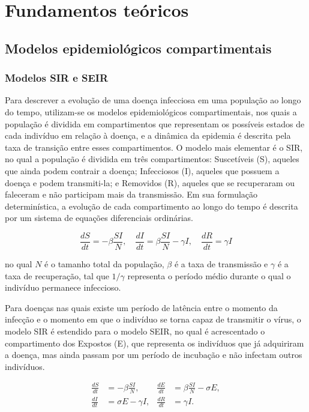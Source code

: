 \documentclass[
	12pt,				%
	openright,			%
	oneside,			%
	a4paper,			%
	english,			%
	french,				%
	spanish,			%
	brazil				%
	]{abntex2}
\begin{document}
\chapter{Fundamentos teóricos}
\label{FT}

\section{Modelos epidemiológicos compartimentais}

\subsection{Modelos SIR e SEIR}

Para descrever a evolução de uma doença infecciosa em uma população ao longo do tempo, utilizam-se os modelos epidemiológicos compartimentais, nos quais a população é dividida em compartimentos que representam os possíveis estados de cada indivíduo em relação à doença, e a dinâmica da epidemia é descrita pela taxa de transição entre esses compartimentos. O modelo mais elementar é o SIR, no qual a população é dividida em três compartimentos: Suscetíveis (S), aqueles que ainda podem contrair a doença; Infecciosos (I), aqueles que possuem a doença e podem transmiti-la; e Removidos (R), aqueles que se recuperaram ou faleceram e não participam mais da transmissão. Em sua formulação determinística, a evolução de cada compartimento ao longo do tempo é descrita por um sistema de equações diferenciais ordinárias.

\begin{equation}\label{eqn:sir}
    \frac{dS}{dt} = -\beta \frac{S I}{N}, \quad
    \frac{dI}{dt} = \beta \frac{S I}{N} - \gamma I, \quad
    \frac{dR}{dt} = \gamma I
\end{equation}

no qual $N$ é o tamanho total da população, $\beta$ é a taxa de transmissão e $\gamma$ é a taxa de recuperação, tal que $1/\gamma$ representa o período médio durante o qual o indivíduo permanece infeccioso.

Para doenças nas quais existe um período de latência entre o momento da infecção e o momento em que o indivíduo se torna capaz de transmitir o vírus, o modelo SIR é estendido para o modelo SEIR, no qual é acrescentado o compartimento dos Expostos (E), que representa os indivíduos que já adquiriram a doença, mas ainda passam por um período de incubação e não infectam outros indivíduos.

\begin{equation}\label{eqn:seir}
\begin{aligned}
    \frac{dS}{dt} &= -\beta \frac{S I}{N}, & \frac{dE}{dt} &= \beta \frac{S I}{N} - \sigma E, \\
    \frac{dI}{dt} &= \sigma E - \gamma I, & \frac{dR}{dt} &= \gamma I.
\end{aligned}
\end{equation}
\end{document}
